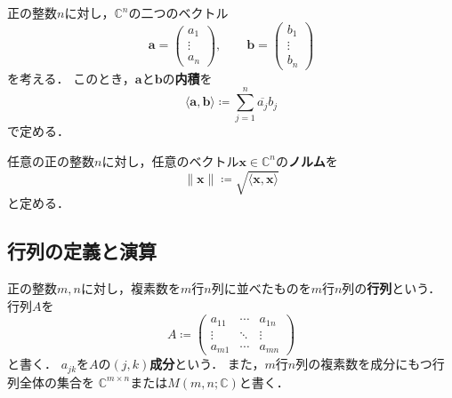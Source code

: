 \begin{samepage}
\begin{defi}[内積]
  正の整数$n$に対し，$\mathbb C^n$の二つのベクトル
  \begin{equation*}
    \bm{a}=
    \begin{pmatrix}
      a_1\\
      \vdots\\
      a_n
    \end{pmatrix},
    \qquad
    \bm{b}=
    \begin{pmatrix}
      b_1\\
      \vdots\\
      b_n
    \end{pmatrix}
  \end{equation*}
  を考える．
  このとき，$\bm{a}$と$\bm{b}$の\textbf{内積}を
  \begin{equation*}
    \langle\bm{a},\bm{b}\rangle\coloneq\sum_{j=1}^{n}\overline{a_j}b_j
  \end{equation*}
  で定める．
\end{defi}
\end{samepage}

\begin{defi}[ノルム]
  \label{def:vector-norm}
  任意の正の整数$n$に対し，任意のベクトル$\bm{x}\in\mathbb C^n$の\textbf{ノルム}を
  \begin{equation*}
    \lVert\bm{x}\rVert\coloneq\sqrt{\langle\bm{x},\bm{x}\rangle}
  \end{equation*}
  と定める．
\end{defi}

\subsection{行列の定義と演算}

\begin{defi}[行列]
  正の整数$m,n$に対し，複素数を$m$行$n$列に並べたものを$m$行$n$列の\textbf{行列}という．
  行列$A$を
  \begin{equation*}
    A\coloneq
    \begin{pmatrix}
      a_{11} & \cdots & a_{1n}\\
      \vdots & \ddots & \vdots\\
      a_{m1} & \cdots & a_{mn}
    \end{pmatrix}
  \end{equation*}
  と書く．
  $a_{jk}$を$A$の$(j,k)$\textbf{成分}という．
  また，$m$行$n$列の複素数を成分にもつ行列全体の集合を
  $\mathbb C^{m\times n}$または$M(m,n;\mathbb C)$と書く．
\end{defi}

